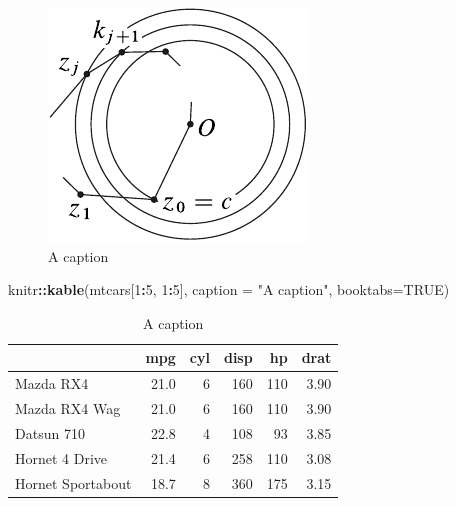 \documentclass[12pt,]{book}
\newenvironment{Shaded}{\begin{snugshade}}{\end{snugshade}}
\newcommand{\DataTypeTok}[1]{\textcolor[rgb]{0.13,0.29,0.53}{#1}}
\newcommand{\DecValTok}[1]{\textcolor[rgb]{0.00,0.00,0.81}{#1}}
\newcommand{\KeywordTok}[1]{\textcolor[rgb]{0.13,0.29,0.53}{\textbf{#1}}}
\newcommand{\NormalTok}[1]{#1}
\newcommand{\OperatorTok}[1]{\textcolor[rgb]{0.81,0.36,0.00}{\textbf{#1}}}
\newcommand{\OtherTok}[1]{\textcolor[rgb]{0.56,0.35,0.01}{#1}}
\newcommand{\StringTok}[1]{\textcolor[rgb]{0.31,0.60,0.02}{#1}}
\theoremstyle{definition}
\theoremstyle{definition}
\theoremstyle{definition}
\theoremstyle{remark}
\begin{document}
\begin{figure}

{\centering \includegraphics[width=1\linewidth]{inverse} 

}

\caption{A caption}\label{fig:pressure}
\end{figure}

\begin{Shaded}
\begin{Highlighting}[]
\NormalTok{knitr}\OperatorTok{::}\KeywordTok{kable}\NormalTok{(mtcars[}\DecValTok{1}\OperatorTok{:}\DecValTok{5}\NormalTok{, }\DecValTok{1}\OperatorTok{:}\DecValTok{5}\NormalTok{], }\DataTypeTok{caption =} \StringTok{"A caption"}\NormalTok{, }\DataTypeTok{booktabs=}\OtherTok{TRUE}\NormalTok{)}
\end{Highlighting}
\end{Shaded}

\begin{table}

\caption{\label{tab:mtcars}A caption}
\centering
\begin{tabular}[t]{lrrrrr}
\toprule
  & mpg & cyl & disp & hp & drat\\
\midrule
Mazda RX4 & 21.0 & 6 & 160 & 110 & 3.90\\
Mazda RX4 Wag & 21.0 & 6 & 160 & 110 & 3.90\\
Datsun 710 & 22.8 & 4 & 108 & 93 & 3.85\\
Hornet 4 Drive & 21.4 & 6 & 258 & 110 & 3.08\\
Hornet Sportabout & 18.7 & 8 & 360 & 175 & 3.15\\
\bottomrule
\end{tabular}
\end{table}
\end{document}
